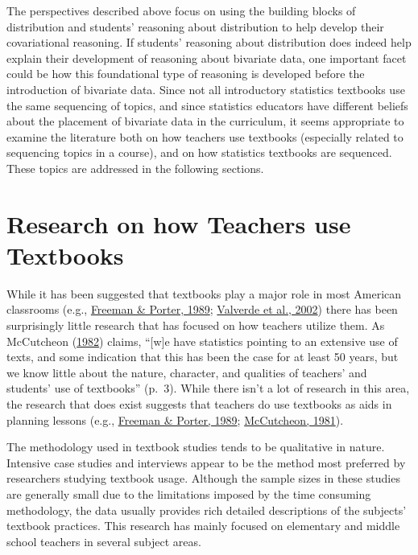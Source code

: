 \documentclass[11pt]{umnthesis}
\begin{document}
The perspectives described above focus on using the building blocks of distribution and students' reasoning about distribution to help develop their covariational reasoning. If students' reasoning about distribution does indeed help explain their development of reasoning about bivariate data, one important facet could be how this foundational type of reasoning is developed before the introduction of bivariate data. Since not all introductory statistics textbooks use the same sequencing of topics, and since statistics educators have different beliefs about the placement of bivariate data in the curriculum, it seems appropriate to examine the literature both on how teachers use textbooks (especially related to sequencing topics in a course), and on how statistics textbooks are sequenced. These topics are addressed in the following sections.

\hypertarget{research-on-how-teachers-use-textbooks}{%
\section{Research on how Teachers use Textbooks}\label{research-on-how-teachers-use-textbooks}}

While it has been suggested that textbooks play a major role in most American classrooms (e.g., \protect\hyperlink{ref-freeman:1989}{Freeman \& Porter, 1989}; \protect\hyperlink{ref-valverde:2002}{Valverde et al., 2002}) there has been surprisingly little research that has focused on how teachers utilize them. As McCutcheon (\protect\hyperlink{ref-mccutcheon:1982}{1982}) claims, ``{[}w{]}e have statistics pointing to an extensive use of texts, and some indication that this has been the case for at least 50 years, but we know little about the nature, character, and qualities of teachers' and students' use of textbooks'' (p.~3). While there isn't a lot of research in this area, the research that does exist suggests that teachers do use textbooks as aids in planning lessons (e.g., \protect\hyperlink{ref-freeman:1989}{Freeman \& Porter, 1989}; \protect\hyperlink{ref-mccutcheon:1981}{McCutcheon, 1981}).

The methodology used in textbook studies tends to be qualitative in nature. Intensive case studies and interviews appear to be the method most preferred by researchers studying textbook usage. Although the sample sizes in these studies are generally small due to the limitations imposed by the time consuming methodology, the data usually provides rich detailed descriptions of the subjects' textbook practices. This research has mainly focused on elementary and middle school teachers in several subject areas.
\end{document}
